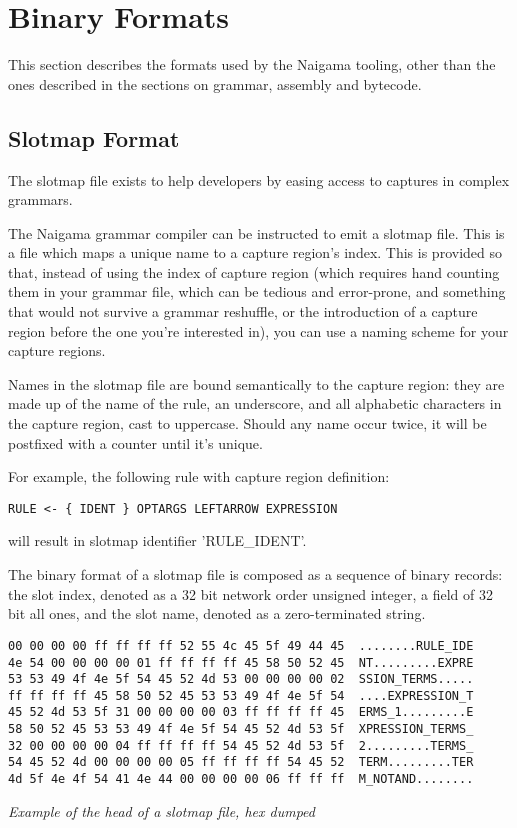 \section{Binary Formats}

This section describes the formats used by the Naigama tooling, other than
the ones described in the sections on grammar, assembly and bytecode.

\subsection{Slotmap Format}

The slotmap file exists to help developers by easing access to
captures in complex grammars.

The Naigama grammar compiler can be instructed to emit a slotmap file.
This is a file which maps a unique name to a capture region's index.
This is provided so that, instead of using the index of capture region
(which requires hand counting them in your grammar file, which can be
tedious and error-prone, and something that would not survive
a grammar reshuffle, or the introduction of a capture region before
the one you're interested in), you can use a naming scheme for your
capture regions.

Names in the slotmap file are bound semantically to the capture region:
they are made up of the name of the rule,
an underscore, and all alphabetic characters in the capture region,
cast to uppercase. Should any name occur twice, it will be postfixed with
a counter until it's unique.

For example, the following rule with capture region definition:

\begin{myquote}
\begin{verbatim}
RULE <- { IDENT } OPTARGS LEFTARROW EXPRESSION
\end{verbatim}
\end{myquote}

will result in slotmap identifier 'RULE\_IDENT'.

The binary format of a slotmap file is composed as a sequence of binary records:
the slot index, denoted as a 32 bit network order unsigned integer, a
field of 32 bit all ones, and the slot name, denoted as a zero-terminated
string.

\begin{myquote}
\begin{verbatim}
00 00 00 00 ff ff ff ff 52 55 4c 45 5f 49 44 45  ........RULE_IDE
4e 54 00 00 00 00 01 ff ff ff ff 45 58 50 52 45  NT.........EXPRE
53 53 49 4f 4e 5f 54 45 52 4d 53 00 00 00 00 02  SSION_TERMS.....
ff ff ff ff 45 58 50 52 45 53 53 49 4f 4e 5f 54  ....EXPRESSION_T
45 52 4d 53 5f 31 00 00 00 00 03 ff ff ff ff 45  ERMS_1.........E
58 50 52 45 53 53 49 4f 4e 5f 54 45 52 4d 53 5f  XPRESSION_TERMS_
32 00 00 00 00 04 ff ff ff ff 54 45 52 4d 53 5f  2.........TERMS_
54 45 52 4d 00 00 00 00 05 ff ff ff ff 54 45 52  TERM.........TER
4d 5f 4e 4f 54 41 4e 44 00 00 00 00 06 ff ff ff  M_NOTAND........

\end{verbatim}
\end{myquote}
\textit{Example of the head of a slotmap file, hex dumped}

